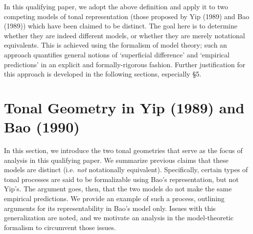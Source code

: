 \documentclass{article}
\begin{document}
In this qualifying paper, we adopt the above definition and apply it to two competing models of tonal representation (those proposed by Yip (1989) and Bao (1989)) which have been claimed to be distinct. The goal here is to determine whether they are indeed different models, or whether they are merely notational equivalents. This is achieved using the formalism of model theory; such an approach quantifies general notions of `superficial difference' and `empirical predictions' in an explicit and formally-rigorous fashion. Further justification for this approach is developed in the following sections, especially \S5.
\section{Tonal Geometry in Yip (1989) and Bao (1990)}
In this section, we introduce the two tonal geometries that serve as the focus of analysis in this qualifying paper. We summarize previous claims that these models are distinct (i.e. \emph{not} notationally equivalent). Specifically, certain types of tonal processes are said to be formalizable using Bao's representation, but not Yip's. The argument goes, then, that the two models do not make the same empirical predictions. We provide an example of such a process, outlining arguments for its representability in Bao's model only. Issues with this generalization are noted, and we motivate an analysis in the model-theoretic formalism to circumvent those issues.
\end{document}
